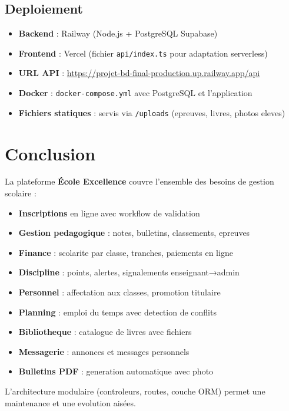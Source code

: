 \documentclass[12pt,a4paper]{article}
\begin{document}
\subsection{Deploiement}
\begin{itemize}
  \item \textbf{Backend} : Railway (Node.js + PostgreSQL Supabase)
  \item \textbf{Frontend} : Vercel (fichier \texttt{api/index.ts} pour adaptation serverless)
  \item \textbf{URL API} : \url{https://projet-bd-final-production.up.railway.app/api}
  \item \textbf{Docker} : \texttt{docker-compose.yml} avec PostgreSQL et l'application
  \item \textbf{Fichiers statiques} : servis via \texttt{/uploads} (epreuves, livres, photos eleves)
\end{itemize}

\newpage

\section{Conclusion}

La plateforme \textbf{École Excellence} couvre l'ensemble des besoins de gestion scolaire :

\begin{itemize}
  \item \textbf{Inscriptions} en ligne avec workflow de validation
  \item \textbf{Gestion pedagogique} : notes, bulletins, classements, epreuves
  \item \textbf{Finance} : scolarite par classe, tranches, paiements en ligne
  \item \textbf{Discipline} : points, alertes, signalements enseignant→admin
  \item \textbf{Personnel} : affectation aux classes, promotion titulaire
  \item \textbf{Planning} : emploi du temps avec detection de conflits
  \item \textbf{Bibliotheque} : catalogue de livres avec fichiers
  \item \textbf{Messagerie} : annonces et messages personnels
  \item \textbf{Bulletins PDF} : generation automatique avec photo
\end{itemize}

L'architecture modulaire (controleurs, routes, couche ORM) permet une maintenance et une evolution aisées.
\end{document}
